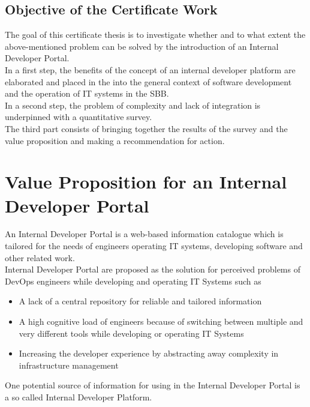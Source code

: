 \documentclass[a4paper,12pt]{article}
\begin{document}
    \subsection{Objective of the Certificate Work}
    \label{subsec:iobjective}
    The goal of this certificate thesis is to investigate whether and to what extent the above-mentioned problem
    can be solved by the introduction of an Internal Developer Portal.\\
    In a first step, the benefits of the concept of an internal developer platform are elaborated and placed in the
    into the general context of software development and the operation of IT systems in the SBB.\\
    In a second step, the problem of complexity and lack of integration is underpinned with a quantitative survey.\\
    The third part consists of bringing together the results of the survey and the value proposition and making a
    recommendation for action.


    \section{Value Proposition for an Internal Developer Portal}
    \label{sec:vp}
    An Internal Developer Portal is a web-based information catalogue which is tailored for the needs of
    engineers operating IT systems, developing software and other related work.\\
    Internal Developer Portal are proposed as the solution for perceived problems\parencite{backstagestory} of DevOps
    engineers while developing and operating IT Systems such as
    \begin{itemize}
        \item A lack of a central repository for reliable and tailored information
        \item A high cognitive load of engineers because of switching between multiple and very different tools while developing or operating IT Systems
        \item Increasing the developer experience by abstracting away complexity in infrastructure management
    \end{itemize}
    One potential source of information for using in the Internal Developer Portal is a so called Internal Developer Platform.
\end{document}
